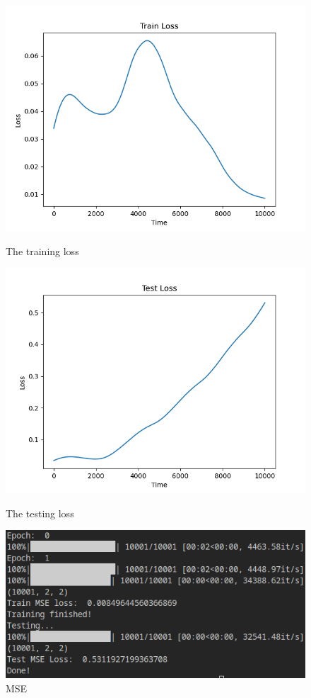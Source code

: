 \documentclass[12pt, a4paper]{article}
\begin{document}
\begin{figure}
    \centering
    \includegraphics[scale=0.6]{../Train_loss.png}
    \caption[]{The training loss}
    \includegraphics[scale=0.6]{../Test_loss.png}
    \caption[]{The testing loss}
    \includegraphics[scale=0.8]{../mse.png}
    \caption[]{MSE}
    \label{fig:loss}
\end{figure}
\end{document}
